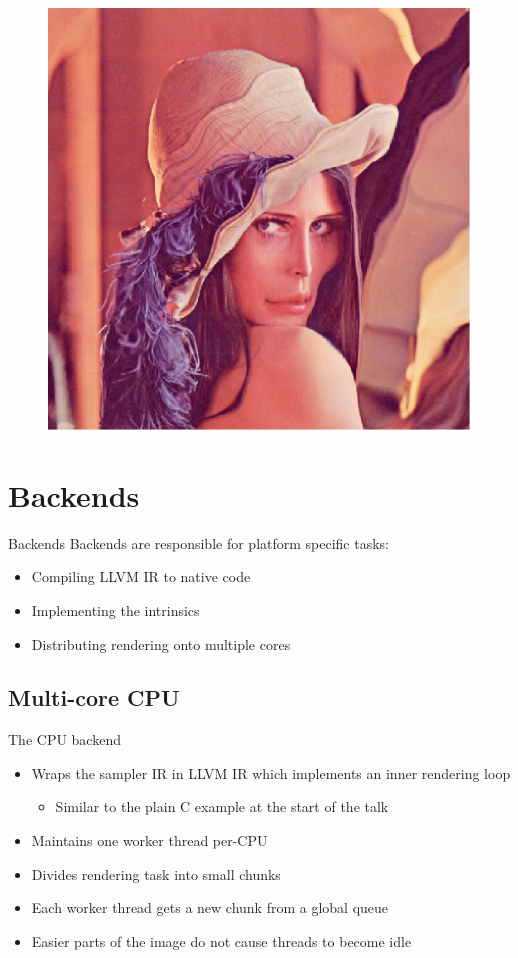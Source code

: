 \documentclass{beamer}
\newcommand{\bi}{\begin{itemize}}
\newcommand{\ei}{\end{itemize}}
\begin{document}
\begin{frame}
  \begin{figure}\centering
  \includegraphics[height=\textheight]{examples/sin-example-2}
  \end{figure}
\end{frame}

\section{Backends} %

\begin{frame}{Backends}
  Backends are responsible for platform specific tasks:
  \bi
    \item Compiling LLVM IR to native code
    \item Implementing the intrinsics
    \item Distributing rendering onto multiple cores
  \ei
\end{frame}


\subsection{Multi-core CPU} %

\begin{frame}{The CPU backend}  
  \bi
    \item Wraps the sampler IR in LLVM IR which implements an inner rendering
    loop
    \bi
      \item Similar to the plain C example at the start of the talk
    \ei
    \item Maintains one worker thread per-CPU
    \item Divides rendering task into small chunks
    \item Each worker thread gets a new chunk from a global queue
    \item Easier parts of the image do not cause threads to become idle
  \ei
\end{frame}
\end{document}
